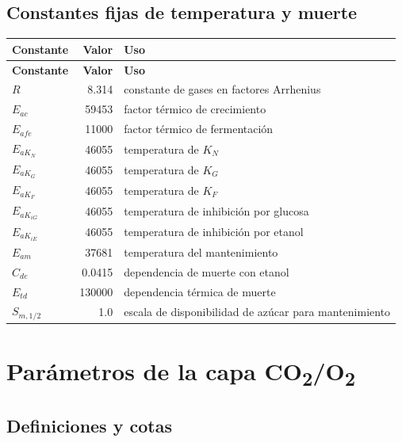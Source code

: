 \documentclass[11pt,a4paper]{article}
\begin{document}
\subsection{Constantes fijas de temperatura y muerte}

\begin{longtable}{lrl}
\toprule
\textbf{Constante} & \textbf{Valor} & \textbf{Uso}\\
\midrule
\endfirsthead
\toprule
\textbf{Constante} & \textbf{Valor} & \textbf{Uso}\\
\midrule
\endhead
$R$ & 8.314 & constante de gases en factores Arrhenius\\
$E_{ac}$ & 59453 & factor térmico de crecimiento\\
$E_{afe}$ & 11000 & factor térmico de fermentación\\
$E_{aK_N}$ & 46055 & temperatura de $K_N$\\
$E_{aK_G}$ & 46055 & temperatura de $K_G$\\
$E_{aK_F}$ & 46055 & temperatura de $K_F$\\
$E_{aK_{iG}}$ & 46055 & temperatura de inhibición por glucosa\\
$E_{aK_{iE}}$ & 46055 & temperatura de inhibición por etanol\\
$E_{am}$ & 37681 & temperatura del mantenimiento\\
$C_{de}$ & 0.0415 & dependencia de muerte con etanol\\
$E_{td}$ & 130000 & dependencia térmica de muerte\\
$S_{m,1/2}$ & 1.0 & escala de disponibilidad de azúcar para mantenimiento\\
\bottomrule
\end{longtable}

\section{Parámetros de la capa CO\textsubscript{2}/O\textsubscript{2}}

\subsection{Definiciones y cotas}
\end{document}
